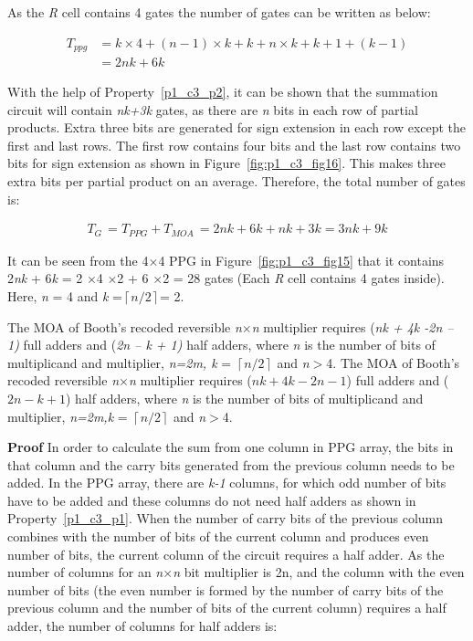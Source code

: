 \noindent As the \textit{R} cell contains {4} gates the number of gates can be written as below:

 \begin{align*}
 T_{ppg} &= k\times 4 + (n-1)\times  k + k + n\times k + k + 1 + (k-1)\\	
 &= 2nk + 6k
 \end{align*}

With the help of Property~\ref{p1_c3_p2}, it can be shown that the summation circuit will contain \textit{nk+3k} gates, as there are \textit{n} bits in each row of partial products. Extra three bits are generated for sign extension in each row except the first and last rows. The first row contains four bits and the last row contains two bits for sign extension as shown in Figure~\ref{fig:p1_c3_fig16}. This makes three extra bits per partial product on an average. Therefore, the total number of gates is:

\begin{align}\label{p1_c3_eqn2}
{T{}_{G\ }= T{}_{PPG} + T{}_{MOA\ }= 2nk + 6k + nk + 3k = 3nk + 9k}
\end{align}

\begin{example}\textnormal{
	It can be seen from the {4$\times $4} PPG in Figure~\ref{fig:p1_c3_fig15} that it contains 2\textit{nk }+ 6\textit{k} = 2 {$\times $}4 {$\times $}2 + 6 {$\times $}2 = 28 gates (Each \textit{R} cell contains {4 }gates inside). Here, \textit{n} = 4 and \textit{k} =$\left\lceil n/2\right\rceil $= 2.}
\end{example}

\begin{property}\label{p1_c3_p_4}\textnormal{
	The MOA of Booth's recoded reversible \textit{n$\times $n } multiplier requires (\textit{nk + 4k -2n -- 1)} full adders and (\textit{2n -- k + 1)} half adders, where \textit{n} is the number of bits of multiplicand and multiplier, \textit{n=2m, k} = $\left\lceil n/2\right\rceil $ and \textit{n}$\mathrm{>}$4. The MOA of Booth's recoded reversible \textit{n$\times $n }multiplier requires ({$nk + 4k-2n-1$)} full adders and ({$2n - k + 1$)} half adders, where \textit{n} is the number of bits of multiplicand and multiplier, \textit{n=2m,k} = $\left\lceil n/2\right\rceil $ and \textit{n}$\mathrm{>}$4.}
\end{property}


\noindent\textbf{Proof}
	In order to calculate the sum from one column in PPG array, the bits in that column and the carry bits generated from the previous column needs to be added. In the PPG array, there are \textit{k-1} columns, for which odd number of bits have to be added and these columns do not need half adders as shown in Property~\ref{p1_c3_p1}. When the number of carry bits of the previous column combines with the number of bits of the current column and produces even number of bits, the current column of the circuit requires a half adder. As the number of columns for an \textit{n$\times $n} bit multiplier is {2n}, and the column with the even number of bits (the even number is formed by the number of carry bits of the previous column and the number of bits of the current column) requires a half adder, the number of columns for half adders is:



